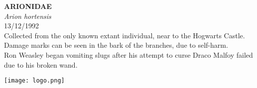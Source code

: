 \documentclass[
  landscape]{article}
\begin{document}
\begin{mdframed}[linecolor=mycolortext, linewidth=2pt, backgroundcolor=mycolor]

  \bigskip
  \begin{flushright}
  \begin{minipage}[t][-50ex][t]{16em}  
  \end{minipage}
  \end{flushright}
  \bigskip
  \begin{adjustwidth}{1cm}{1cm}
  {\fontsize{50pt}{0pt}\selectfont\bf\textcolor{mycolortext}{ ARIONIDAE }} \\
  \linebreak
  \linebreak
  {\fontsize{40pt}{100pt}\selectfont\textcolor{mycolortext}{\emph{ Arion hortensis }}} \\
  \vfill
  {\fontsize{30pt}{100pt}\selectfont\textcolor{mycolortext}{ 13/12/1992 }} \\
  \vfill
  {\fontsize{30pt}{100pt}\selectfont\textcolor{mycolortext}{ Collected from the only known extant individual, near to the Hogwarts Castle. Damage marks can be seen in the bark of the branches, due to self-harm. }} \\
  \vfill
  {\fontsize{30pt}{50pt}\selectfont\textcolor{mycolortext}{ Ron Weasley began vomiting slugs after his attempt to curse Draco Malfoy failed due to his broken wand. }} \\
  \end{adjustwidth}
  \begin{center}
  \texttt{[image: logo.png]}
  \end{center}
  \end{mdframed}
  \pagebreak

\end{document}
